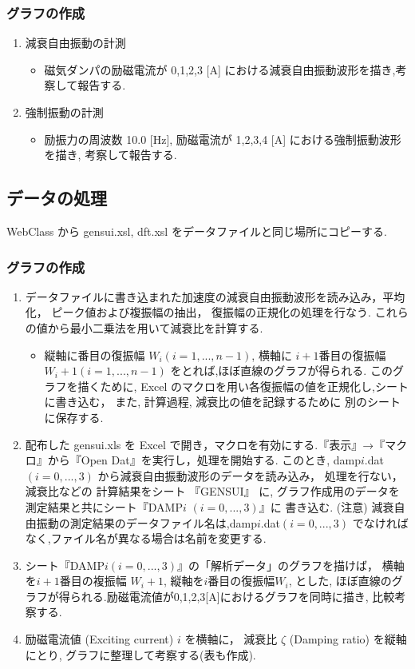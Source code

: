\documentclass[a4paper,10.5pt]{jsarticle}
\begin{document}
\subsubsection{グラフの作成}
\begin{enumerate}
  \item 減衰自由振動の計測
  \begin{itemize}
    \item 磁気ダンパの励磁電流が 0,1,2,3 [A] における減衰自由振動波形を描き,考察して報告する.
  \end{itemize}
  \item 強制振動の計測
  \begin{itemize}
    \item 励振力の周波数 10.0 [Hz], 励磁電流が 1,2,3,4 [A] における強制振動波形を描き, 考察して報告する.
  \end{itemize}
\end{enumerate}

\subsection{データの処理}
WebClass から gensui.xsl, dft.xsl をデータファイルと同じ場所にコピーする.

\subsubsection{グラフの作成}
\begin{enumerate}
  \item データファイルに書き込まれた加速度の減衰自由振動波形を読み込み，平均化， ピーク値および複振幅の抽出，
  復振幅の正規化の処理を行なう. これらの値から最小二乗法を用いて減衰比を計算する.
  \begin{itemize}
    \item 縦軸に番目の復振幅 $W_i(i=1,...,n-1)$, 
    横軸に $i+1$番目の復振幅 $W_i+1 (i=1,...,n-1)$ をとれば,ほぼ直線のグラフが得られる. 
    このグラフを描くために, Excel のマクロを用い各復振幅の値を正規化し,シートに書き込む，
    また, 計算過程, 減衰比の値を記録するために 別のシートに保存する.
  \end{itemize}
  \item 配布した gensui.xls を Excel で開き，マクロを有効にする.『表示』→『マクロ』から『Open Dat』を実行し，処理を開始する.
  このとき, damp$i$.dat$(i=0,...,3)$ から減衰自由振動波形のデータを読み込み， 
  処理を行ない，減衰比などの 計算結果をシート 『GENSUI』 に, 
  グラフ作成用のデータを測定結果と共にシート『DAMP$i$ $(i=0,...,3)$』に 書き込む.
  (注意) 減衰自由振動の測定結果のデータファイル名は,damp$i$.dat$(i=0,...,3)$ でなければなく,ファイル名が異なる場合は名前を変更する.
  \item シート『DAMP$i (i=0,...,3)$』の「解析データ」のグラフを描けば， 横軸を$i+1$番目の複振幅 $W_i+1$,
  縦軸を$i$番目の復振幅$W_i$, とした, ほぼ直線のグラフが得られる.励磁電流値が0,1,2,3[A]におけるグラフを同時に描き, 比較考察する.
  \item 励磁電流値 (Exciting current) $i$ を横軸に，
  減衰比 $\zeta$ (Damping ratio) を縦軸にとり, グラフに整理して考察する(表も作成).
\end{enumerate}
\end{document}
